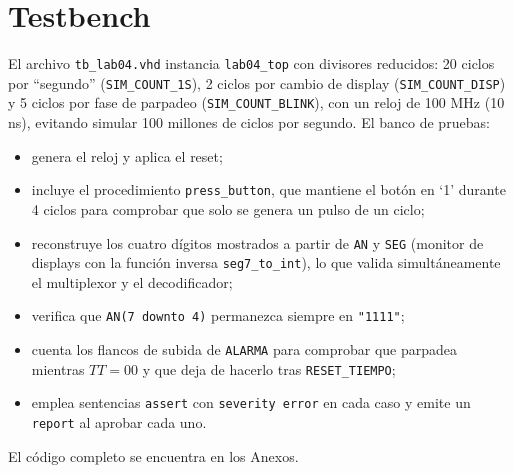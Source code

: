 \documentclass[letterpaper,12pt]{article}
\begin{document}
\section{Testbench}
El archivo \texttt{tb\_lab04.vhd} instancia \texttt{lab04\_top} con divisores reducidos: 20 ciclos por ``segundo'' (\texttt{SIM\_COUNT\_1S}), 2 ciclos por cambio de display (\texttt{SIM\_COUNT\_DISP}) y 5 ciclos por fase de parpadeo (\texttt{SIM\_COUNT\_BLINK}), con un reloj de 100 MHz (10 ns), evitando simular 100 millones de ciclos por segundo. El banco de pruebas:
\begin{itemize}
    \item genera el reloj y aplica el reset;
    \item incluye el procedimiento \texttt{press\_button}, que mantiene el botón en `1' durante 4 ciclos para comprobar que solo se genera un pulso de un ciclo;
    \item reconstruye los cuatro dígitos mostrados a partir de \texttt{AN} y \texttt{SEG} (monitor de displays con la función inversa \texttt{seg7\_to\_int}), lo que valida simultáneamente el multiplexor y el decodificador;
    \item verifica que \texttt{AN(7 downto 4)} permanezca siempre en \texttt{"1111"};
    \item cuenta los flancos de subida de \texttt{ALARMA} para comprobar que parpadea mientras $TT=00$ y que deja de hacerlo tras \texttt{RESET\_TIEMPO};
    \item emplea sentencias \texttt{assert} con \texttt{severity error} en cada caso y emite un \texttt{report} al aprobar cada uno.
\end{itemize}
El código completo se encuentra en los Anexos.
\end{document}
